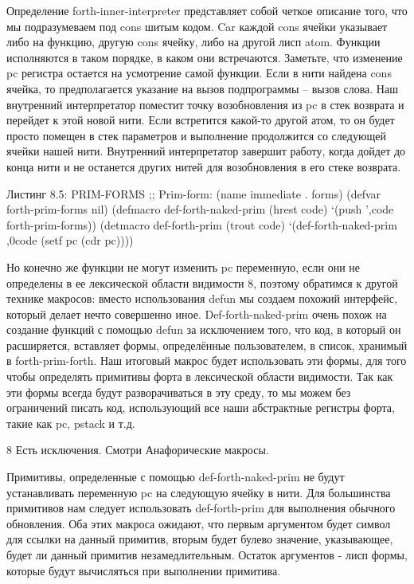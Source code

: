 Определение forth-inner-interpreter представляет собой четкое описание того, что мы подразумеваем под cons шитым кодом. Car каждой cons ячейки указывает либо на функцию, другую cons ячейку, либо на другой лисп atom. Функции исполняются в таком порядке, в каком они встречаются. Заметьте, что изменение pc регистра остается на усмотрение самой функции. Если в нити найдена cons ячейка, то предполагается указание на вызов подпрограммы – вызов слова. Наш внутренний интерпретатор поместит точку возобновления из pc в стек возврата и перейдет к этой новой нити. Если встретится какой-то другой атом, то он будет просто помещен в стек параметров и выполнение продолжится со следующей ячейки нашей нити. Внутренний интерпретатор завершит работу, когда дойдет до конца нити и не останется других нитей для возобновления в его стеке возврата.

Листинг 8.5: PRIM-FORMS
;; Prim-form: (name immediate . forms)
(defvar forth-prim-forms nil)
(defmacro def-forth-naked-prim (hrest code)
  ‘(push ’,code forth-prim-forms))
(detmacro def-forth-prim (trout code)
  ‘(def-forth-naked-prim
,0code
(setf pc (cdr pc)))) 

Но конечно же функции не могут изменить pc переменную, если они не определены в ее лексической области видимости 8, поэтому обратимся к другой технике макросов: вместо использования defun мы создаем похожий интерфейс, который делает нечто совершенно иное. Def-forth-naked-prim очень похож на создание функций с помощью defun за исключением того, что код, в который он расширяется, вставляет формы, определённые пользователем, в список, хранимый в forth-prim-forth. Наш итоговый макрос будет использовать эти формы, для того чтобы определять примитивы форта в лексической области видимости. Так как эти формы всегда будут разворачиваться в эту среду, то мы можем без ограничений писать код, использующий все наши абстрактные регистры форта, такие как pc, pstack и т.д.

8 Есть исключения. Смотри Анафорические макросы.

Примитивы, определенные с помощью def-forth-naked-prim не будут устанавливать переменную pc на следующую ячейку в нити. Для большинства примитивов нам следует использовать def-forth-prim для выполнения обычного обновления. Оба этих макроса ожидают, что первым аргументом будет символ для ссылки на данный примитив, вторым будет булево значение, указывающее, будет ли данный примитив незамедлительным. Остаток аргументов - лисп формы, которые будут вычисляться при выполнении примитива.

